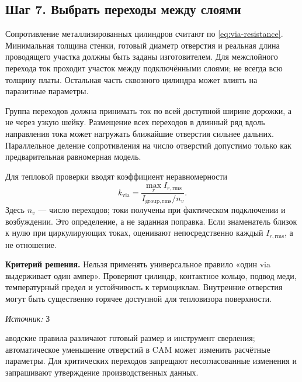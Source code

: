 \documentclass[14pt,a4paper]{extarticle}
\newcommand{\source}[1]{\par\noindent\textit{Источник:} #1\par}
\newcommand{\criterion}{\par\noindent\textbf{Критерий решения.} }
\begin{document}
\subsection{Шаг 7. Выбрать переходы между слоями}
Сопротивление металлизированных цилиндров считают по \eqref{eq:via-resistance}. Минимальная толщина стенки, готовый диаметр отверстия и реальная длина проводящего участка должны быть заданы изготовителем. Для межслойного перехода ток проходит участок между подключёнными слоями; не всегда всю толщину платы. Остальная часть сквозного цилиндра может влиять на паразитные параметры.

Группа переходов должна принимать ток по всей доступной ширине дорожки, а не через узкую шейку. Размещение всех переходов в длинный ряд вдоль направления тока может нагружать ближайшие отверстия сильнее дальних. Параллельное деление сопротивления на число отверстий допустимо только как предварительная равномерная модель.

Для тепловой проверки вводят коэффициент неравномерности
\begin{equation}
 k_{\mathrm{via}}=\frac{\max_r I_{r,\mathrm{rms}}}{I_{\mathrm{group,rms}}/n_v}.
 \label{pl:eq:via-imbalance}
\end{equation}
Здесь $n_v$ --- число переходов; токи получены при фактическом подключении и возбуждении. Это определение, а не заданная поправка. Если знаменатель близок к нулю при циркулирующих токах, оценивают непосредственно каждый $I_{r,\mathrm{rms}}$, а не отношение.

\criterion Нельзя применять универсальное правило «один via выдерживает один ампер». Проверяют цилиндр, контактное кольцо, подвод меди, температурный предел и устойчивость к термоциклам. Внутренние отверстия могут быть существенно горячее доступной для тепловизора поверхности.

\source Заводские правила различают готовый размер и инструмент сверления; автоматическое уменьшение отверстий в CAM может изменить расчётные параметры. Для критических переходов запрещают несогласованные изменения и запрашивают утверждение производственных данных.\cite{web18}
\end{document}
